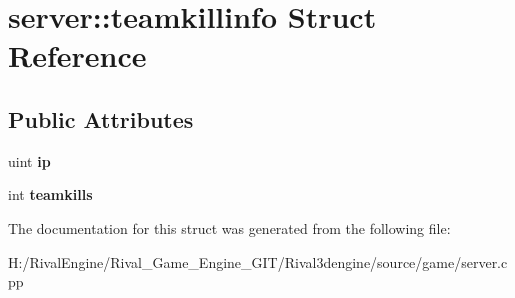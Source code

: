 \hypertarget{structserver_1_1teamkillinfo}{}\section{server\+:\+:teamkillinfo Struct Reference}
\label{structserver_1_1teamkillinfo}
\subsection*{Public Attributes}
\begin{DoxyCompactItemize}
\item 
\mbox{\label{structserver_1_1teamkillinfo_a6f9479eff65012befe176ea4ce21e608}} 
uint {\bfseries ip}
\item 
\mbox{\label{structserver_1_1teamkillinfo_a46556f20d22302b5b58db1f9e5bfc11c}} 
int {\bfseries teamkills}
\end{DoxyCompactItemize}


The documentation for this struct was generated from the following file\+:\begin{DoxyCompactItemize}
\item 
H\+:/\+Rival\+Engine/\+Rival\+\_\+\+Game\+\_\+\+Engine\+\_\+\+G\+I\+T/\+Rival3dengine/source/game/server.\+cpp\end{DoxyCompactItemize}
